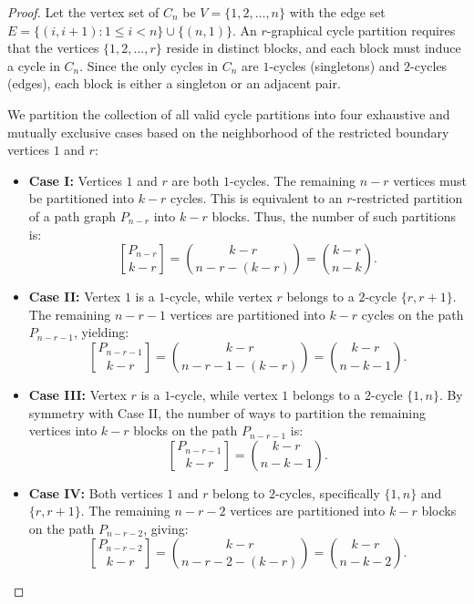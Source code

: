 \documentclass{amsart}
\newcounter{cases}
\theoremstyle{definition}
\begin{document}
\begin{proof}
Let the vertex set of $C_n$ be $V = \{1, 2, \dots, n\}$ with the edge set $E = \{(i, i+1) : 1 \le i < n\} \cup \{(n, 1)\}$. An $r$-graphical cycle partition requires that the vertices $\{1, 2, \dots, r\}$ reside in distinct blocks, and each block must induce a cycle in $C_n$. Since the only cycles in $C_n$ are $1$-cycles (singletons) and $2$-cycles (edges), each block is either a singleton or an adjacent pair. 

We partition the collection of all valid cycle partitions into four exhaustive and mutually exclusive cases based on the neighborhood of the restricted boundary vertices $1$ and $r$:

\begin{itemize}
    \item \textbf{Case I:} Vertices $1$ and $r$ are both $1$-cycles. 
    The remaining $n-r$ vertices must be partitioned into $k-r$ cycles. This is equivalent to an $r$-restricted partition of a path graph $P_{n-r}$ into $k-r$ blocks. Thus, the number of such partitions is:
    \begin{equation*}
        {P_{n-r} \brack k-r} = \binom{k-r}{n-r-(k-r)} = \binom{k-r}{n-k}.
    \end{equation*}

    \item \textbf{Case II:} Vertex $1$ is a $1$-cycle, while vertex $r$ belongs to a $2$-cycle $\{r, r+1\}$. 
    The remaining $n-r-1$ vertices are partitioned into $k-r$ cycles on the path $P_{n-r-1}$, yielding:
    \begin{equation*}
        {P_{n-r-1} \brack k-r} = \binom{k-r}{n-r-1-(k-r)} = \binom{k-r}{n-k-1}.
    \end{equation*}

    \item \textbf{Case III:} Vertex $r$ is a $1$-cycle, while vertex $1$ belongs to a $2$-cycle $\{1, n\}$. 
    By symmetry with Case II, the number of ways to partition the remaining vertices into $k-r$ blocks on the path $P_{n-r-1}$ is:
    \begin{equation*}
        {P_{n-r-1} \brack k-r} = \binom{k-r}{n-k-1}.
    \end{equation*}

    \item \textbf{Case IV:} Both vertices $1$ and $r$ belong to $2$-cycles, specifically $\{1, n\}$ and $\{r, r+1\}$. 
    The remaining $n-r-2$ vertices are partitioned into $k-r$ blocks on the path $P_{n-r-2}$, giving:
    \begin{equation*}
        {P_{n-r-2} \brack k-r} = \binom{k-r}{n-r-2-(k-r)} = \binom{k-r}{n-k-2}.
    \end{equation*}
\end{itemize}


\end{proof}
\end{document}

